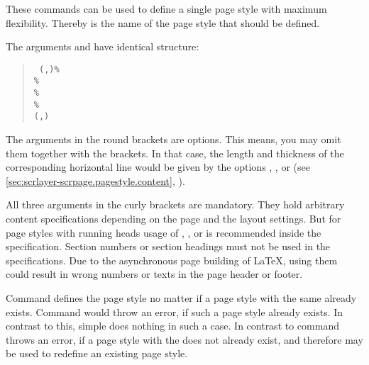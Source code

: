 \begin{Declaration}
\end{Declaration}
These commands can be used to define a single page style with maximum
flexibility. Thereby  is the name of the page style that should
be defined.

The arguments  and  have
identical structure:
\begin{quote}\raggedright
  \texttt{%
    (,)\%\\
    \%\\
    \%\\
    \%\\
    (,)%
  }
\end{quote}
The arguments in the round brackets are options. This means, you may
omit them together with the brackets. In that case, the length and thickness
of the corresponding horizontal line would be given by the \KOMAScript{}
options , ,  or
 (see \autoref{sec:scrlayer-scrpage.pagestyle.content},
).

All three arguments in the curly brackets are mandatory. They hold arbitrary
content specifications depending on the page and the layout settings. But for
page styles with running heads usage of , , or
 is recommended inside the specification. Section numbers or
section headings must not be used in the specifications. Due to the
asynchronous page building of \LaTeX, using them could result in wrong numbers
or texts in the page header or footer.

Command  defines the page style no matter if a page style
with the same  already exists. Command  would
throw an error, if such a page style already exists. In contrast to this,
 simple does nothing in such a case. In contrast to
 command  throws an error, if a page
style with the  does not already exist, and therefore may be used
to redefine an existing page style.

